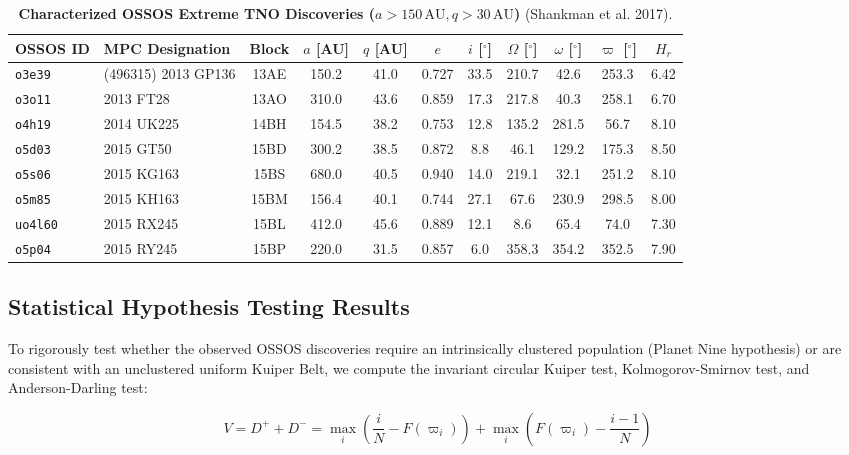 \documentclass[11pt,a4paper]{article}
\begin{document}
\begin{table}[H]
\centering
\caption{\textbf{Characterized OSSOS Extreme TNO Discoveries ($a > 150\,\text{AU}, q > 30\,\text{AU}$)} (Shankman et al. 2017).}
\label{tab:sample}
\vspace{0.4em}
\small
\begin{tabular}{llccccccccc}
\toprule
\textbf{OSSOS ID} & \textbf{MPC Designation} & \textbf{Block} & \textbf{$a$ [AU]} & \textbf{$q$ [AU]} & \textbf{$e$} & \textbf{$i$ [$^\circ$]} & \textbf{$\Omega$ [$^\circ$]} & \textbf{$\omega$ [$^\circ$]} & \textbf{$\varpi$ [$^\circ$]} & \textbf{$H_r$} \\
\midrule
\texttt{o3e39} & (496315) 2013 GP136 & 13AE & 150.2 & 41.0 & 0.727 & 33.5 & 210.7 & 42.6 & 253.3 & 6.42 \\
\texttt{o3o11} & 2013 FT28           & 13AO & 310.0 & 43.6 & 0.859 & 17.3 & 217.8 & 40.3 & 258.1 & 6.70 \\
\texttt{o4h19} & 2014 UK225          & 14BH & 154.5 & 38.2 & 0.753 & 12.8 & 135.2 & 281.5 & 56.7 & 8.10 \\
\texttt{o5d03} & 2015 GT50           & 15BD & 300.2 & 38.5 & 0.872 & 8.8  & 46.1  & 129.2 & 175.3 & 8.50 \\
\texttt{o5s06} & 2015 KG163          & 15BS & 680.0 & 40.5 & 0.940 & 14.0 & 219.1 & 32.1  & 251.2 & 8.10 \\
\texttt{o5m85} & 2015 KH163          & 15BM & 156.4 & 40.1 & 0.744 & 27.1 & 67.6  & 230.9 & 298.5 & 8.00 \\
\texttt{uo4l60} & 2015 RX245         & 15BL & 412.0 & 45.6 & 0.889 & 12.1 & 8.6   & 65.4  & 74.0  & 7.30 \\
\texttt{o5p04} & 2015 RY245          & 15BP & 220.0 & 31.5 & 0.857 & 6.0  & 358.3 & 354.2 & 352.5 & 7.90 \\
\bottomrule
\end{tabular}
\end{table}

\subsection{Statistical Hypothesis Testing Results}
To rigorously test whether the observed OSSOS discoveries require an intrinsically clustered population (Planet Nine hypothesis) or are consistent with an unclustered uniform Kuiper Belt, we compute the invariant circular Kuiper test, Kolmogorov-Smirnov test, and Anderson-Darling test:

\begin{equation}
V = D^+ + D^- = \max_i \left( \frac{i}{N} - F(\varpi_i) \right) + \max_i \left( F(\varpi_i) - \frac{i - 1}{N} \right)
\label{eq:kuiper}
\end{equation}
\end{document}
